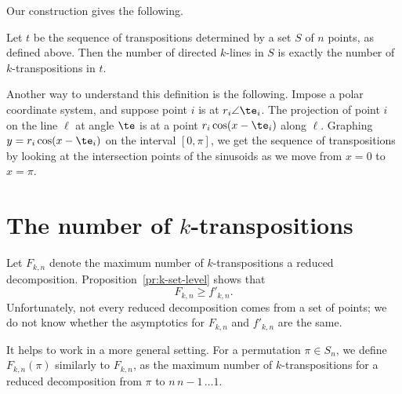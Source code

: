 \documentclass[12pt, reqno]{amsart}
\begin{document}
Our construction gives the following.
\begin{pr}\label{pr:k-set-level}
Let $t$ be the sequence of transpositions determined by a set $S$ of $n$ points, as defined above. Then the number of directed $k$-lines in $S$ is exactly the number of $k$-transpositions in $t$.
\end{pr}

Another way to understand this definition is the following. Impose a polar coordinate system, and suppose point $i$ is at $r_i\angle \te_i$. The projection of point $i$ on the line $\ell$ at angle $\te$ is at a point $r_i\cos(x-\te_i)$ along $\ell$. Graphing $y=r_i\cos(x-\te_i)$ on the interval $[0,\pi]$, we get the sequence of transpositions by looking at the intersection points of the sinusoids as we move from $x=0$ to $x=\pi$.

\section{The number of $k$-transpositions}

Let $F_{k,n}$ denote the maximum number of $k$-transpositions a reduced decomposition. Proposition~\ref{pr:k-set-level} shows that
\[
F_{k,n}\ge f'_{k,n}.
\]
Unfortunately, not every reduced decomposition comes from a set of points; we do not know whether the asymptotics for $F_{k,n}$ and $f'_{k,n}$ are the same.

It helps to work in a more general setting. For a permutation $\pi\in S_n$, we define $F_{k,n}(\pi)$ similarly to $F_{k,n}$, as the maximum number of $k$-transpositions  for a reduced decomposition from $\pi$ to $n\,n-1\,\ldots 1$. 
\end{document}

